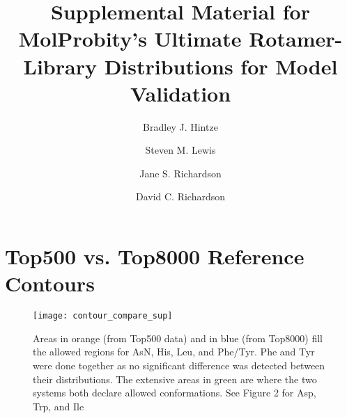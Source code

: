 \documentclass{article}
\begin{document}
\title{Supplemental Material for MolProbity's Ultimate Rotamer-Library Distributions for Model Validation}
\author{Bradley J. Hintze}
\author{Steven M. Lewis}
\author{Jane S. Richardson}
\author{David C. Richardson}
\date{}
\maketitle
\listoffigures
\listoftables
\newpage

\section*{Top500 vs. Top8000 Reference Contours}
\begin{figure}[h]
  \centering
  \texttt{[image: contour\_compare\_sup]}
  \caption[Top500 vs Top8000 Contours for Residues with 2 $\chi$s ]
      {Areas in orange (from Top500 data) and in blue (from Top8000) fill
      the allowed regions for AsN, His, Leu, and Phe/Tyr. Phe and Tyr were done
      together as no significant difference was detected between their distributions.
      The extensive areas in green are where the two systems both declare allowed 
      conformations. See Figure 2 for Asp, Trp, and Ile}
    \label{fig:outcounts}
\end{figure}
\newpage


\newpage

\newpage

\newpage

\newpage
\end{document}
